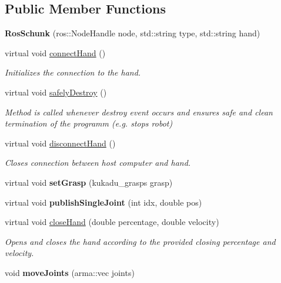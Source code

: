 \subsection*{Public Member Functions}
\begin{DoxyCompactItemize}
\item 
\hypertarget{classkukadu_1_1RosSchunk_aa15781f706cc2591f4e2e5ec12136800}{{\bfseries Ros\-Schunk} (ros\-::\-Node\-Handle node, std\-::string type, std\-::string hand)}\label{classkukadu_1_1RosSchunk_aa15781f706cc2591f4e2e5ec12136800}

\item 
virtual void \hyperlink{classkukadu_1_1RosSchunk_a2b263c93cd2afe970121fe0102b5e502}{connect\-Hand} ()
\begin{DoxyCompactList}\small\item\em Initializes the connection to the hand. \end{DoxyCompactList}\item 
virtual void \hyperlink{classkukadu_1_1RosSchunk_a3a50fb0908f1fac2151934ba9759825c}{safely\-Destroy} ()
\begin{DoxyCompactList}\small\item\em Method is called whenever destroy event occurs and ensures safe and clean termination of the programm (e.\-g. stops robot) \end{DoxyCompactList}\item 
virtual void \hyperlink{classkukadu_1_1RosSchunk_a8b07d0af90c8b1b0827eb9587007a7c0}{disconnect\-Hand} ()
\begin{DoxyCompactList}\small\item\em Closes connection between host computer and hand. \end{DoxyCompactList}\item 
\hypertarget{classkukadu_1_1RosSchunk_ac94d4d5cc98000f0aeba0f99c9393f25}{virtual void {\bfseries set\-Grasp} (kukadu\-\_\-grasps grasp)}\label{classkukadu_1_1RosSchunk_ac94d4d5cc98000f0aeba0f99c9393f25}

\item 
\hypertarget{classkukadu_1_1RosSchunk_a2e63ac42d96b5849b26103fe6273c5bf}{virtual void {\bfseries publish\-Single\-Joint} (int idx, double pos)}\label{classkukadu_1_1RosSchunk_a2e63ac42d96b5849b26103fe6273c5bf}

\item 
virtual void \hyperlink{classkukadu_1_1RosSchunk_accae3e1fa1da2b98bfeddf06d3682f81}{close\-Hand} (double percentage, double velocity)
\begin{DoxyCompactList}\small\item\em Opens and closes the hand according to the provided closing percentage and velocity. \end{DoxyCompactList}\item 
\hypertarget{classkukadu_1_1RosSchunk_a0e29db81dedf7db7ef47ce4c8d4887c6}{void {\bfseries move\-Joints} (arma\-::vec joints)}\label{classkukadu_1_1RosSchunk_a0e29db81dedf7db7ef47ce4c8d4887c6}


\end{DoxyCompactItemize}
